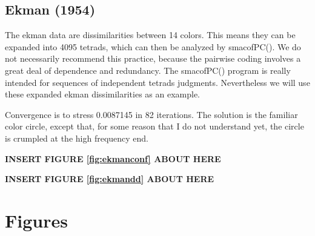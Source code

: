 \documentclass[
  12pt,
]{article}
\begin{document}
\subsection{Ekman (1954)}\label{ekman_54}

The ekman data are dissimilarities between 14 colors. This means they can be
expanded into 4095 tetrads, which can then be
analyzed by smacofPC(). We do not necessarily recommend this practice, because
the pairwise coding involves a great deal of dependence and redundancy.
The smacofPC() program is really intended for sequences of independent tetrads judgments. Nevertheless we will use these expanded ekman dissimilarities as an example.

Convergence is to stress 0.0087145 in 82 iterations. The solution is the
familiar color circle, except that, for some reason that I do not understand yet, the circle is crumpled at the high frequency
end.

\begin{greybox}

\begin{center}
\textbf{INSERT FIGURE \ref{fig:ekmanconf} ABOUT HERE}

\end{center}

\end{greybox}

\begin{greybox}

\begin{center}
\textbf{INSERT FIGURE \ref{fig:ekmandd} ABOUT HERE}

\end{center}

\end{greybox}

\section{Figures}\label{figures}
\end{document}
